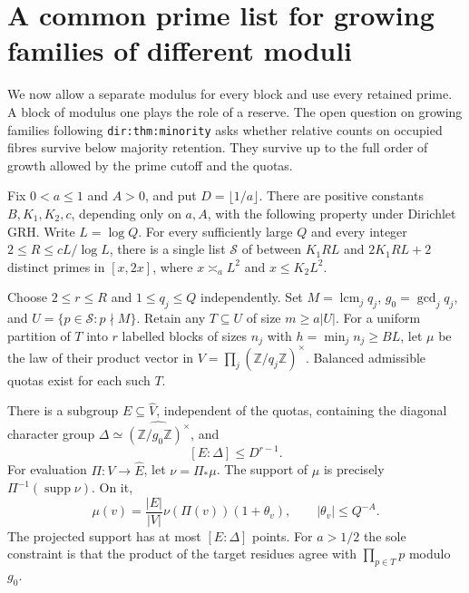 \section{A common prime list for growing families of different moduli}\label{sec:mixed}
We now allow a separate modulus for every block and use every retained prime. A block of modulus one plays the role of a reserve. The open question on growing families following \texttt{dir:thm:minority} asks whether relative counts on occupied fibres survive below majority retention. They survive up to the full order of growth allowed by the prime cutoff and the quotas.

\begin{theorem}\label{th:mixed}
Fix \(0<a\le1\) and \(A>0\), and put \(D=\lfloor1/a\rfloor\). There are positive constants \(B,K_1,K_2,c\), depending only on \(a,A\), with the following property under Dirichlet GRH. Write \(L=\log Q\). For every sufficiently large \(Q\) and every integer \(2\le R\le cL/\log L\), there is a single list \(\mathcal S\) of between \(K_1 R L\) and \(2K_1 R L+2\) distinct primes in \([x,2x]\), where \(x\asymp_a L^2\) and \(x\le K_2 L^2\).

Choose \(2\le r\le R\) and \(1\le q_j\le Q\) independently. Set \(M=\operatorname{lcm}_j q_j\), \(g_0=\gcd_j q_j\), and \(U=\{p\in\mathcal S:p\nmid M\}\). Retain any \(T\subseteq U\) of size \(m\ge a|U|\). For a uniform partition of \(T\) into \(r\) labelled blocks of sizes \(n_j\) with \(h=\min_j n_j\ge BL\), let \(\mu\) be the law of their product vector in \(V=\prod_j(\mathbb Z/q_j\mathbb Z)^\times\). Balanced admissible quotas exist for each such \(T\).

There is a subgroup \(E\subseteq\widehat V\), independent of the quotas, containing the diagonal character group \(\Delta\simeq\widehat{(\mathbb Z/g_0\mathbb Z)^\times}\), and
\[
 [E:\Delta]\le D^{r-1}.
\]
For evaluation \(\Pi:V\to\widehat E\), let \(\nu=\Pi_*\mu\). The support of \(\mu\) is precisely \(\Pi^{-1}(\operatorname{supp}\nu)\). On it,
\[
   \mu(v)=\frac{|E|}{|V|}\nu(\Pi(v))(1+\theta_v),
       \qquad |\theta_v|\le Q^{-A}.
\]
The projected support has at most \([E:\Delta]\) points. For \(a>1/2\) the sole constraint is that the product of the target residues agree with \(\prod_{p\in T}p\) modulo \(g_0\).
\end{theorem}

